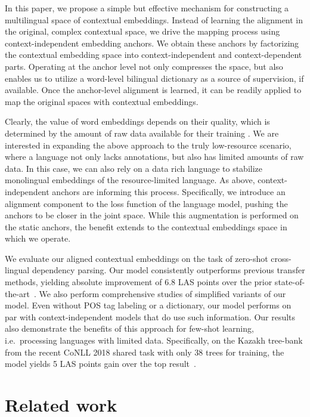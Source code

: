 \documentclass[11pt,a4paper]{article}
\begin{document}
In this paper, we propose a simple but effective mechanism for constructing a multilingual space of contextual embeddings. 
Instead of learning the alignment in the original, complex contextual space, we drive the mapping process using context-independent embedding anchors. We obtain these anchors by factorizing the contextual embedding space into context-independent and context-dependent parts. 
Operating at the anchor level not only compresses the space, but also enables us to utilize a word-level bilingual dictionary as a source of supervision, if available. Once the anchor-level alignment is learned, it can be readily applied to map the original spaces with contextual embeddings. 

Clearly, the value of word embeddings depends on their quality, which is determined by the amount of raw data available for their training \cite{jiang2018learning}. We are interested in expanding the above approach to the truly low-resource scenario, where a language  not only lacks annotations, but also has limited amounts of raw data. In this case, we can also rely on a data rich language to stabilize monolingual embeddings of the resource-limited language. As above, context-independent anchors are informing this process.  Specifically, we introduce an alignment component to the loss function of the language model, pushing the anchors to be closer in the joint space. While this augmentation is performed on the static anchors, the benefit extends to the contextual embeddings space in which we operate.

We evaluate our aligned contextual embeddings on the task of zero-shot cross-lingual dependency parsing. Our model consistently outperforms previous transfer methods, yielding absolute improvement of 6.8 LAS points over the prior state-of-the-art~\cite{ammar_one_2016}. We also perform comprehensive studies of simplified variants of our model.
Even without POS tag labeling or a dictionary, our model performs on par with context-independent models that do use such information. Our results also demonstrate the benefits of this approach for few-shot learning, i.e.\ processing languages with limited data. Specifically, on the Kazakh tree-bank from the recent CoNLL 2018 shared task with only 38 trees for training, the model yields 5 LAS points gain over the top result~\cite{smith201882}. 





 
\section{Related work}
\end{document}
